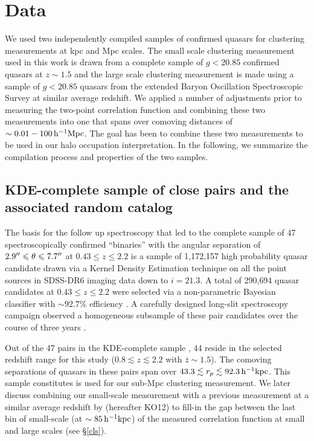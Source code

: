 \documentclass[useAMS,usenatbib]{mn2e}
\begin{document}
\section{Data}\label{dat}
 We used two independently compiled samples of confirmed quasars for clustering 
measurements at kpc and Mpc scales. The small scale clustering measurement used in this work is drawn from a complete sample of 
$g<20.85$ confirmed quasars at $z \sim 1.5$ and the large scale clustering measurement is 
made using a sample of $g<20.85$ quasars from the extended Baryon 
Oscillation Spectroscopic Survey \citep[eBOSS; DR14][]{daw16,dr14} at similar average redshift. We applied a number of adjustments prior to measuring the two-point correlation function and combining these two measurements into one that spans over comoving distances of $\sim 0.01-100 \, \rm h^{-1}Mpc$. The goal has been to combine these two measurements to be used in our halo occupation interpretation. In the following, we summarize the compilation process and properties of the two samples.

\subsection{KDE-complete sample of close pairs and the associated random catalog}\label{sdat}
The basis for the follow up spectroscopy that led to the complete sample of 47 spectroscopically confirmed ``binaries'' with the angular separation of $2.9\arcsec \leq \theta \leq 7.7\arcsec$ at $0.43 \leq z \leq 2.2$ is a sample of 1{,}172{,}157 high probability quasar candidate drawn via a Kernel Density Estimation technique \citep[KDE;][]{ric04} on all the point sources in SDSS-DR6\citep[][]{admc08} imaging data down to $i=21.3$. A total of 290{,}694 quasar candidates at $0.43 \leq z \leq 2.2$ were selected via a non-parametric Bayesian classifier with $\sim 92.7\%$ efficiency \citep[see ][and references therein for detail]{ef17}. A carefully designed long-slit spectroscopy campaign observed a homogeneous subsample of these pair candidates over the course of three years \citep[see Table 1 of ][for detail]{ef17}. 

Out of the 47 pairs in the KDE-complete sample \citep[presented in Figure 4 and Table 5 of][]{ef17}, 44 reside in the selected redshift range for this study ($0.8 \lesssim z \lesssim 2.2$ with $\bar z\sim 1.5$). The comoving separations of quasars in these pairs span over $43.3 \lesssim r_p \lesssim 92.3 \, \rm h^{-1}kpc$. This sample constitutes is used for our sub-Mpc clustering measurement. We later discuss combining our small-scale measurement with a previous measurement at a similar average redshift by \citet{ko12} (hereafter KO12) to fill-in the gap between the last bin of small-scale (at $\sim 85 \, \rm h^{-1}kpc$) of the measured correlation function at small and large scales (see \S\ref{cls}). 
\end{document}
